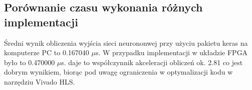 \subsection{Porównanie czasu wykonania różnych implementacji}

Średni wynik obliczenia wyjścia sieci neurononwej przy użyciu pakietu keras na komputerze PC to 0.167040 $\mu$s. W przypadku implementacji w układzie FPGA było to 0.470000 $\mu$s. daje to współczynnik akceleracji obliczeń ok. 2.81 co jest dobrym wynikiem, biorąc pod uwagę ograniczenia w optymalizacji kodu w narzędziu Vivado HLS.
